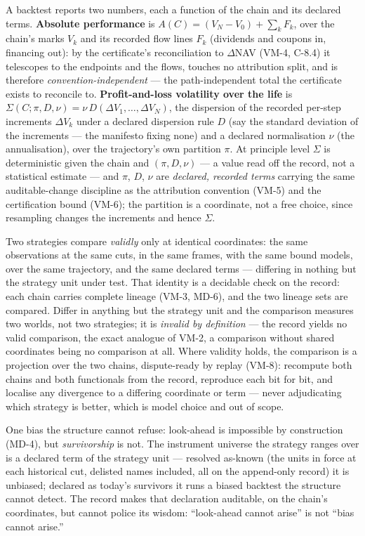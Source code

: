 \documentclass[11pt,a4paper]{article}
\begin{document}
A backtest reports two numbers, each a function of the chain and its declared
terms. \textbf{Absolute performance} is
$A(C) = (V_N - V_0) + \sum_{k} F_k$, over the chain's marks $V_k$ and its recorded
flow lines $F_k$ (dividends and coupons in, financing out): by the certificate's
reconciliation to $\Delta$NAV (VM-4, C-8.4) it telescopes to the endpoints and the
flows, touches no attribution split, and is therefore \emph{convention-independent}
--- the path-independent total the certificate exists to reconcile to.
\textbf{Profit-and-loss volatility over the life} is
$\Sigma(C;\pi,D,\nu) = \nu\,D(\Delta V_1,\dots,\Delta V_N)$, the dispersion of the
recorded per-step increments $\Delta V_k$ under a declared dispersion rule $D$
(say the standard deviation of the increments --- the manifesto fixing none) and
a declared normalisation $\nu$ (the annualisation), over the trajectory's own
partition $\pi$. At
principle level $\Sigma$ is deterministic given the chain and $(\pi,D,\nu)$ --- a
value read off the record, not a statistical estimate --- and $\pi$, $D$, $\nu$ are
\emph{declared, recorded terms} carrying the same auditable-change discipline as
the attribution convention (VM-5) and the certification bound (VM-6); the partition
is a coordinate, not a free choice, since resampling changes the increments and
hence $\Sigma$.

Two strategies compare \emph{validly} only at identical coordinates: the same
observations at the same cuts, in the same frames, with the same bound models, over
the same trajectory, and the same declared terms --- differing in nothing but the
strategy unit under test. That identity is a decidable check on the record: each
chain carries complete lineage (VM-3, MD-6), and the two lineage sets are compared.
Differ in anything but the strategy unit and the comparison measures two worlds,
not two strategies; it is \emph{invalid by definition} --- the record yields no
valid comparison, the exact analogue of VM-2, a comparison without shared
coordinates being no comparison at all. Where validity holds, the comparison is a
projection over the two chains, dispute-ready by replay (VM-8): recompute both
chains and both functionals from the record, reproduce each bit for bit, and
localise any divergence to a differing coordinate or term --- never adjudicating
which strategy is better, which is model choice and out of scope.

One bias the structure cannot refuse: look-ahead is impossible by construction
(MD-4), but \emph{survivorship} is not. The instrument universe the strategy
ranges over is a declared term of the strategy unit --- resolved as-known (the
units in force at each historical cut, delisted names included, all on the
append-only record) it is unbiased; declared as today's survivors it runs a
biased backtest the structure cannot detect. The record makes that declaration
auditable, on the chain's coordinates, but cannot police its wisdom:
``look-ahead cannot arise'' is not ``bias cannot arise.''
\end{document}
